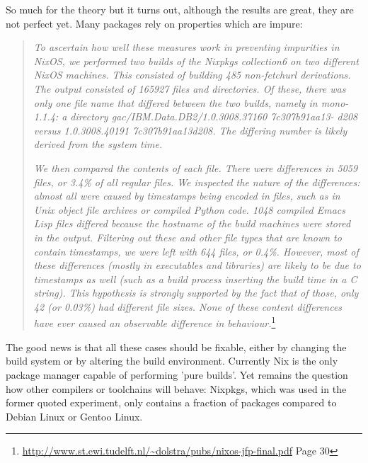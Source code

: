 \documentclass[a4paper,10pt]{article}
\begin{document}
So much for the theory but it turns out, although the results are great, they are not perfect yet. Many packages rely on properties which are impure:
\begin{quote}
\textit{To ascertain how well these measures work in preventing impurities in NixOS, we performed two builds of the Nixpkgs collection6 on two different NixOS machines. This consisted of building 485 non-fetchurl derivations. The output consisted of 165927 files and directories. Of these, there was only one file name that differed between the two builds, namely in mono-1.1.4: a directory gac/IBM.Data.DB2/1.0.3008.37160 7c307b91aa13-
d208 versus 1.0.3008.40191 7c307b91aa13d208. The differing number is likely derived from the system time. }

\textit{We then compared the contents of each file. There were differences in 5059 files, or 3.4\% of all regular files. We inspected the nature of the differences: almost all were caused by timestamps being encoded in files, such as in Unix object file archives or compiled Python code. 1048 compiled Emacs Lisp files differed because the hostname of the build machines were stored in the output. Filtering out these and other file types that are known to contain timestamps, we were left with 644 files, or 0.4\%. However, most of these differences (mostly in executables and libraries) are likely to be due to timestamps as well (such as a build process inserting the build time in a C string). This hypothesis is strongly supported by the fact that of those, only 42 (or 0.03\%) had different file sizes. None of these content differences have ever caused an observable difference in behaviour.}\footnote{\url{http://www.st.ewi.tudelft.nl/~dolstra/pubs/nixos-jfp-final.pdf} Page 30}
\end{quote}

The good news is that all these cases should be fixable, either by changing the build system or by altering the build environment. Currently Nix is the only package manager capable of performing 'pure builds'. Yet remains the question how other compilers or toolchains will behave: Nixpkgs, which was used in the former quoted experiment, only contains a fraction of packages compared to Debian Linux or Gentoo Linux.
\end{document}
